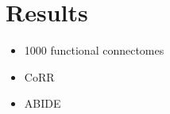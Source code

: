 \section{Results}
\begin{itemize}
\item 1000 functional connectomes
\item CoRR 
\item ABIDE 
\end{itemize}

